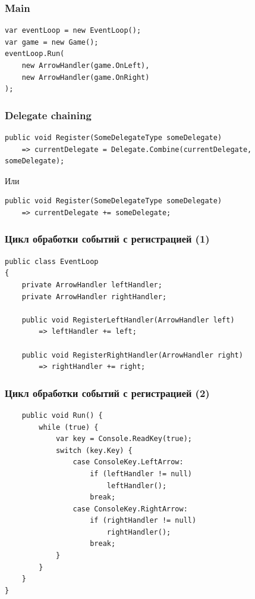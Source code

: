 \documentclass{../../slides-style}
\begin{document}
    \begin{frame}[fragile]
        \frametitle{Main}
        \begin{verbatim}
var eventLoop = new EventLoop();
var game = new Game();
eventLoop.Run(
    new ArrowHandler(game.OnLeft), 
    new ArrowHandler(game.OnRight)
);
        \end{verbatim}
    \end{frame}

    \begin{frame}[fragile]
        \frametitle{Delegate chaining}
        \begin{verbatim}
public void Register(SomeDelegateType someDelegate)
    => currentDelegate = Delegate.Combine(currentDelegate, someDelegate);
        \end{verbatim}
        \vspace{3mm}
        Или
        \begin{verbatim}
public void Register(SomeDelegateType someDelegate)
    => currentDelegate += someDelegate;
        \end{verbatim}
    \end{frame}

    \begin{frame}[fragile]
        \frametitle{Цикл обработки событий с регистрацией (1)}
        \begin{verbatim}
public class EventLoop
{
    private ArrowHandler leftHandler;
    private ArrowHandler rightHandler;

    public void RegisterLeftHandler(ArrowHandler left)
        => leftHandler += left;

    public void RegisterRightHandler(ArrowHandler right)
        => rightHandler += right;
        \end{verbatim}
    \end{frame}

    \begin{frame}[fragile]
        \frametitle{Цикл обработки событий с регистрацией (2)}
        \begin{verbatim}
    public void Run() {
        while (true) {
            var key = Console.ReadKey(true);
            switch (key.Key) {
                case ConsoleKey.LeftArrow:
                    if (leftHandler != null)
                        leftHandler();
                    break;
                case ConsoleKey.RightArrow:
                    if (rightHandler != null)
                        rightHandler();
                    break;
            }
        }
    }
}
        \end{verbatim}
    \end{frame}
\end{document}
